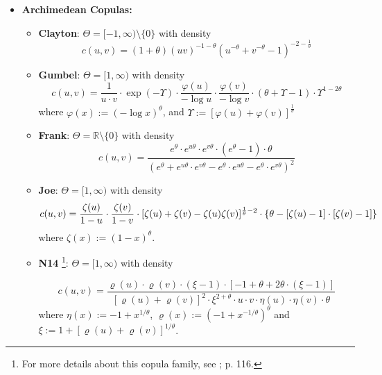\begin{itemize}
\item \textbf{Archimedean Copulas:} 
    \begin{itemize}
    \item \textbf{Clayton}: $\Theta = [-1, \infty)\setminus \{0\}$ with density
$$\displaystyle
c(u,v) = (1+\theta)(uv)^{-1-\theta}(u^{-\theta} + v^{-\theta} - 1)^{-2-\frac{1}{\theta}}
$$
    \item \textbf{Gumbel}: $\Theta = [1, \infty)$ with density
$$
c(u, v) = 
\frac{1}{u \cdot v} 
\cdot 
\exp(-\Upsilon) 
\cdot 
\frac{\varphi(u)}{-\log u} 
\cdot 
\frac{\varphi(v)}{-\log v} 
\cdot 
(\theta + \Upsilon - 1)
\cdot 
\Upsilon^{1-2\theta}%
$$
where
$\varphi(x):=(-\log x)^{\theta}$,
and
$\Upsilon := [\varphi(u) + \varphi(v)]^{\frac{1}{\theta}}$
    \item \textbf{Frank}: $\Theta = \mathbb{R}\setminus\{0\}$ with density
$$\displaystyle
c(u, v) = 
\frac{e^{\theta} \cdot e^{u\theta} \cdot e^{v\theta} \cdot (e^{\theta} - 1) \cdot \theta}{(e^{\theta} + e^{u\theta} \cdot e^{v\theta} - e^{\theta} \cdot e^{u\theta} - e^{\theta} \cdot e^{v\theta})^2}
$$
    \item \textbf{Joe}: $\Theta = [1, \infty)$ with density
$$\displaystyle
c(u, v) = 
\frac{\zeta(u)}{1-u} 
\cdot 
\frac{\zeta(v)}{1-v} 
\cdot 
[\zeta(u) + \zeta(v) - \zeta(u)\zeta(v)]^{\frac{1}{\theta} - 2} 
\cdot 
\{\theta - [\zeta(u) - 1] \cdot [\zeta(v) - 1]\}
\\
$$
where
$\zeta(x):=(1-x)^{\theta}$.
    \end{itemize}

    \begin{itemize}
    \item \textbf{N14} \footnote{For more details about this copula family, see \cite{Nelsen2006}; p. 116.}: $\Theta = [1,\infty)$ with density
    
$$\displaystyle
c(u, v) = 
\frac{
	\varrho(u) 
	\cdot 
	\varrho(v) 
	\cdot 
	(\xi - 1) 
	\cdot 
	[-1 + \theta + 2 \theta \cdot (\xi - 1)]
}
{
	[\varrho(u) + \varrho(v)]^2 
	\cdot
	\xi^{2 + \theta} 
	\cdot 
	u \cdot v 
	\cdot 
	\eta(u) \cdot \eta(v) \cdot \theta}
$$
where 
$\eta(x) := -1 + x^{1/\theta}$,
$\varrho(x) := (-1 + x^{-1/\theta})^{\theta}$ and 
$\xi := 1 + [\varrho(u) + \varrho(v)]^{1/\theta}$.
    \end{itemize}
    

\end{itemize}
